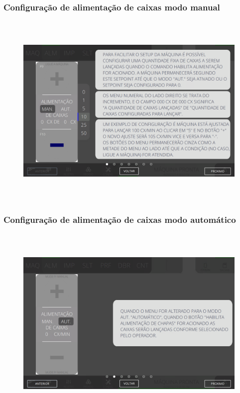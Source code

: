 \subsubsection{\small{Configuração de alimentação de caixas modo manual}}\label{miniTelaComandoAlimentacaoConfiguracaoDeAlimentacaoDeCaixasModoManual}
\vspace*{\fill}
\begin{figure}[h]
  \centering
  \includegraphics[width=576px,height=360px]{src/imagesMiniline/03-Feeder/commands/e1.png}
\end{figure}
\vspace*{\fill}


\newpage
\thispagestyle{fancy}
\vspace*{40 pt}
\subsubsection{\small{Configuração de alimentação de caixas modo automático}}\label{miniTelaComandoAlimentacaoConfiguracaoDeAlimentacaoDeCaixasModoAutomatico}
\vspace*{\fill}
\begin{figure}[h]
  \centering
  \includegraphics[width=576px,height=360px]{src/imagesMiniline/03-Feeder/commands/e2.png}
\end{figure}
\vspace*{\fill}

